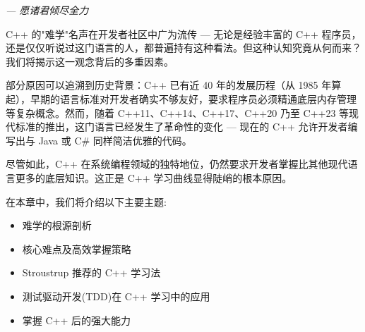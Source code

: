 \begin{flushright}
\textit{--- 愿诸君倾尽全力}
\end{flushright}

C++ 的"难学"名声在开发者社区中广为流传 --- 无论是经验丰富的 C++ 程序员，还是仅仅听说过这门语言的人，都普遍持有这种看法。但这种认知究竟从何而来？我们将揭示这一观念背后的多重因素。

部分原因可以追溯到历史背景：C++ 已有近 40 年的发展历程（从 1985 年算起），早期的语言标准对开发者确实不够友好，要求程序员必须精通底层内存管理等复杂概念。然而，随着 C++11、C++14、C++17、C++20 乃至 C++23 等现代标准的推出，这门语言已经发生了革命性的变化 --- 现在的 C++ 允许开发者编写出与 Java 或 C\# 同样简洁优雅的代码。

尽管如此，C++ 在系统编程领域的独特地位，仍然要求开发者掌握比其他现代语言更多的底层知识。这正是 C++ 学习曲线显得陡峭的根本原因。

在本章中，我们将介绍以下主要主题:

\begin{itemize}
\item 
难学的根源剖析

\item 
核心难点及高效掌握策略

\item 
Stroustrup 推荐的 C++ 学习法

\item 
测试驱动开发(TDD)在 C++ 学习中的应用

\item 
掌握 C++ 后的强大能力
\end{itemize}




